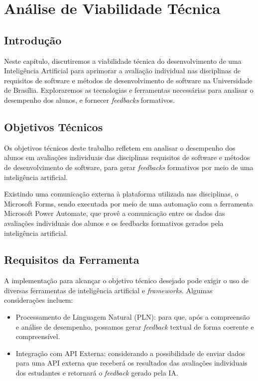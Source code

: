 \chapter{Análise de Viabilidade Técnica}

\section{Introdução}

Neste capítulo, discutiremos a viabilidade técnica do desenvolvimento de uma Inteligência Artificial para aprimorar a avaliação individual nas disciplinas de requisitos de software e métodos de desenvolvimento de software na Universidade de Brasília. Exploraremos as tecnologias e ferramentas necessárias para analisar o desempenho dos alunos, e fornecer \textit{feedbacks} formativos.

\section{Objetivos Técnicos}

Os objetivos técnicos deste trabalho refletem em analisar o desempenho dos alunos em avaliações individuais das disciplinas requisitos de software e métodos de desenvolvimento de software, para gerar \textit{feedbacks} formativos por meio de uma inteligência artificial.

Existindo uma comunicação externa à plataforma utilizada nas disciplinas, o Microsoft Forms, sendo executada por meio de uma automação com a ferramenta Microsoft Power Automate, que provê a comunicação entre os dados das avaliações individuais dos alunos e os feedbacks formativos gerados pela inteligência artificial.

\section{Requisitos da Ferramenta}

A implementação para alcançar o objetivo técnico desejado pode exigir o uso de diversas ferramentas de inteligência artificial e \textit{frameworks}. Algumas considerações incluem:

\begin{itemize}
  \item Processamento de Linguagem Natural (PLN): para que, após a compreensão e análise de desempenho, possamos gerar \textit{feedback} textual de forma coerente e compreensível.
  \item Integração com API Externa: considerando a possibilidade de enviar dados para uma API externa que receberá os resultados das avaliações individuais dos estudantes e retornará o \textit{feedback} gerado pela IA.
\end{itemize}

